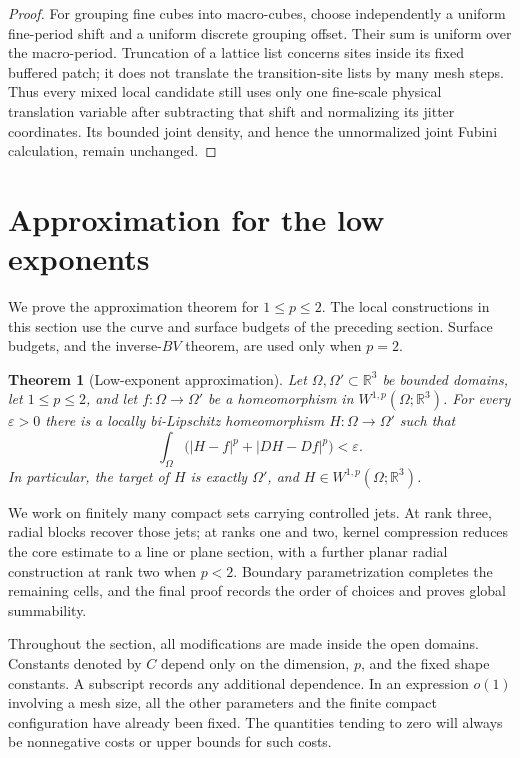 \documentclass[11pt]{article}
\numberwithin{equation}{section}
\newtheorem{theorem}{Theorem}[section]
\theoremstyle{definition}
\theoremstyle{remark}
\begin{document}
\begin{proof}
For grouping fine cubes into macro-cubes, choose independently
a uniform fine-period shift and a uniform discrete grouping
offset.  Their sum is uniform over the macro-period.  Truncation
of a lattice list concerns sites inside its fixed buffered patch;
it does not translate the transition-site lists by many mesh
steps.  Thus every mixed local candidate still uses only one
fine-scale physical translation variable after subtracting that
shift and normalizing its jitter coordinates.  Its bounded joint
density, and hence the unnormalized joint Fubini calculation,
remain unchanged.
\end{proof}

\section{Approximation for the low exponents}\label{sec:low-assembly}

We prove the approximation theorem for $1\le p\le2$.  The local
constructions in this section use the curve and surface budgets of the
preceding section.  Surface budgets, and the inverse-$BV$ theorem, are
used only when $p=2$.

\begin{theorem}[Low-exponent approximation]\label{la:approximation}
Let $\Omega,\Omega'\subset\mathbb R^3$ be bounded domains, let $1\le p\le2$, and
let $f:\Omega\to\Omega'$ be a homeomorphism in
$W^{1,p}(\Omega;\mathbb R^3)$.  For every $\varepsilon>0$ there is a locally
bi-Lipschitz homeomorphism $H:\Omega\to\Omega'$ such that
\begin{equation}\label{la:goal}
 \int_\Omega \bigl(|H-f|^p+|DH-Df|^p\bigr)<\varepsilon.
\end{equation}
In particular, the target of $H$ is exactly $\Omega'$, and
$H\in W^{1,p}(\Omega;\mathbb R^3)$.
\end{theorem}

We work on finitely many compact sets carrying controlled jets.
At rank three, radial blocks recover those jets; at ranks one and two,
kernel compression reduces the core estimate to a line or plane section,
with a further planar radial construction at rank two when $p<2$.
Boundary parametrization completes the remaining cells, and the final
proof records the order of choices and proves global summability.

Throughout the section, all modifications are made inside the open
domains.  Constants denoted by $C$ depend only on the dimension, $p$,
and the fixed shape constants.  A subscript records any additional
dependence.  In an expression $o(1)$ involving a mesh size, all the
other parameters and the finite compact configuration have already
been fixed.  The quantities tending to zero will always be
nonnegative costs or upper bounds for such costs.
\end{document}
